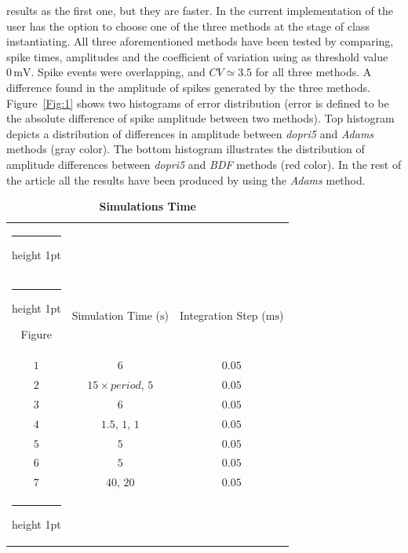 \documentclass[10pt,a4paper,onecolumn]{article}
\makeatletter
\newcommand{\Rm}[1]{\mathrm{#1}}
\newcommand{\thickhline}{%
    \noalign {\ifnum 0=`}\fi \hrule height 1pt
    \futurelet \reserved@a \@xhline
}
\makeatother
\begin{document}
results as the first one, but they are faster. In the current implementation
of \cite{wang:1994} the user has the option to choose one of the three methods
at the stage of class instantiating. All three aforementioned methods have
been tested by comparing, spike times, amplitudes and the coefficient
of variation using as threshold value $0\, \Rm{mV}$. Spike events were
overlapping, and $CV \simeq 3.5$ for all three methods. A difference found 
in the amplitude of spikes generated by the three methods. Figure~\ref{Fig:1}
shows two histograms of error distribution (error is defined to be the
absolute difference of spike amplitude between two methods). Top histogram 
depicts a distribution of differences in amplitude between \emph{dopri5} 
and \emph{Adams} methods (gray color). The bottom histogram illustrates the 
distribution of amplitude differences between \emph{dopri5} and \emph{BDF}
methods (red color). In the rest of the article all the results have been 
produced by using the \emph{Adams} method.
\begin{table}[!htbp]
    \centering
    \begin{tabular}{ccc}
        \thickhline
        \multicolumn{3}{c}{Simulation Time} \\ \thickhline
        Figure & Simulation Time ($\Rm{s}$) & Integration Step ($\Rm{ms}$) \\ 
        \rowcolor{LightGray}
        $1$ & $6$ & $0.05$ \\ \rowcolor{Gray}
        $2$ & $15\times period$, $5$ & $0.05$ \\ \rowcolor{LightGray}
        $3$ & $6$ & $0.05$ \\ \rowcolor{Gray} 
        $4$ & $1.5$, $1$, $1$ & $0.05$ \\ \rowcolor{LightGray} 
        $5$ & $5$ & $0.05$  \\ \rowcolor{Gray} 
        $6$ & $5$ & $0.05$  \\ \rowcolor{LightGray} 
        $7$ & $40$, $20$ & $0.05$  \\ \thickhline
    \end{tabular}
    \caption{{\bfseries \sffamily Simulations Time}}
    \label{Table:2}
\end{table}
\end{document}
